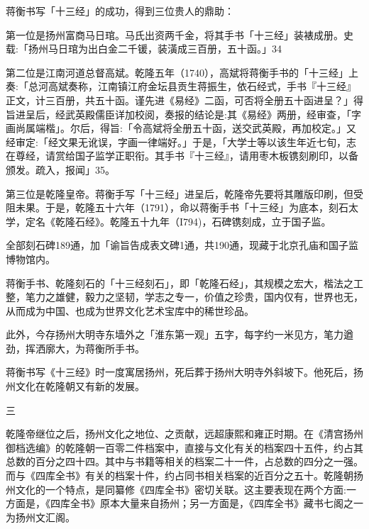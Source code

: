 蒋衡书写「十三经」的成功，得到三位贵人的鼎助：

第一位是扬州富商马日琯。马氏出资两千金，将其手书「十三经」装裱成册。史载:「扬州马日琯为出白金二千锾，装潢成三百册，五十函。」34

第二位是江南河道总督高斌。乾隆五年（1740），高斌将蒋衡手书的「十三经」上奏:「总河高斌奏称，江南镇江府金坛县贡生蒋振生，依石经式，手书『十三经』正文，计三百册，共五十函。谨先进《易经》二函，可否将全册五十函进呈？」得旨进呈后，经武英殿儒臣详加校阅，奏报的结论是:其《易经》两册，经审查，「字画尚属端楷」。尔后，得旨:「令高斌将全册五十函，送交武英殿，再加校定。」又经审定:「经文果无讹误，字画一律端好。」于是，「大学士等以该生年近七旬，志在尊经，请赏给国子监学正职衔。其手书『十三经』，请用枣木板镌刻刷印，以备颁发。疏入，报闻」35。

第三位是乾隆皇帝。蒋衡手写「十三经」进呈后，乾隆帝先要将其雕版印刷，但受阻未果。于是，乾隆五十六年（1791），命以蒋衡手书「十三经」为底本，刻石太学，定名《乾隆石经》。乾隆五十九年（I794)，石碑镌刻成，立于国子监。

\vfill
\begin{BookNotes}
\end{BookNotes}

\noindent 全部刻石碑189通，加「谕旨告成表文碑1通，共190通，现藏于北京孔庙和国子监博物馆内。

蒋衡手书、乾隆刻石的「十三经刻石」，即「乾隆石经」，其规模之宏大，楷法之工整，笔力之雄健，毅力之坚韧，学志之专一，价值之珍贵，国内仅有，世界也无，从而成为中国、也成为世界文化艺术宝库中的稀世珍品。

此外，今存扬州大明寺东墙外之「淮东第一观」五字，每字约一米见方，笔力遒劲，挥洒廓大，为蒋衡所手书。

蒋衡书写《十三经》时一度寓居扬州，死后葬于扬州大明寺外斜坡下。他死后，扬州文化在乾隆朝又有新的发展。

三

乾隆帝继位之后，扬州文化之地位、之贡献，远超康熙和雍正时期。在《清宫扬州御档选编》的乾隆朝一百零二件档案中，直接与文化有关的档案四十五件，约占其总数的百分之四十四。其中与书籍等相关的档案二十一件，占总数的四分之一强。而与《四库全书》有关的档案十件，约占同书相关档案的近百分之五十。乾隆朝扬州文化的一个特点，是同纂修《四库全书》密切关联。这主要表现在两个方面:一方面是，《四库全书》原本大量来自扬州；另一方面是，《四库全书》藏书七阁之一为扬州文汇阁。

